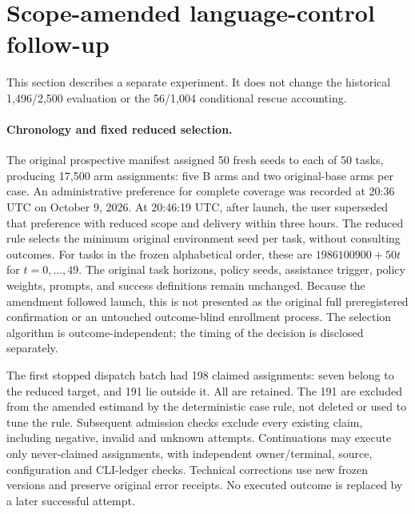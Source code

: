 \section{Scope-amended language-control follow-up}
\label{s:reduced}
This section describes a separate experiment. It does not change the historical 1,496/2,500 evaluation or the 56/1,004 conditional rescue accounting.

\paragraph{Chronology and fixed reduced selection.}
The original prospective manifest assigned 50 fresh seeds to each of 50 tasks, producing 17,500 arm assignments: five B arms and two original-base arms per case. An administrative preference for complete coverage was recorded at 20:36 UTC on October 9, 2026. At 20:46:19 UTC, after launch, the user superseded that preference with reduced scope and delivery within three hours. The reduced rule selects the minimum original environment seed per task, without consulting outcomes. For tasks in the frozen alphabetical order, these are $1986100900+50t$ for $t=0,\ldots,49$. The original task horizons, policy seeds, assistance trigger, policy weights, prompts, and success definitions remain unchanged. Because the amendment followed launch, this is not presented as the original full preregistered confirmation or an untouched outcome-blind enrollment process. The selection algorithm is outcome-independent; the timing of the decision is disclosed separately.

The first stopped dispatch batch had 198 claimed assignments: seven belong to the reduced target, and 191 lie outside it. All are retained. The 191 are excluded from the amended estimand by the deterministic case rule, not deleted or used to tune the rule. Subsequent admission checks exclude every existing claim, including negative, invalid and unknown attempts. Continuations may execute only never-claimed assignments, with independent owner/terminal, source, configuration and CLI-ledger checks. Technical corrections use new frozen versions and preserve original error receipts. No executed outcome is replaced by a later successful attempt.

